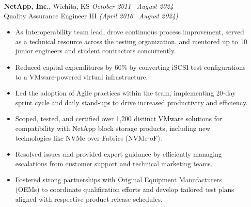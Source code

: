 \documentclass[10pt]{article}       %
\begin{document}
\textbf{NetApp, Inc.}, Wichita, KS \hfill \textit{October 2011 \textendash\ August 2024} \\
\vspace{1pt}
Quality Assurance Engineer III \textit{(April 2016 \textendash\ August 2024)} \\
\begin{itemize}
  \item As Interoperability team lead, drove continuous process improvement, served as a technical resource across the testing organization, and mentored up to 10 junior engineers and student contractors concurrently.
  \item Reduced capital expenditures by 60\% by converting iSCSI test configurations to a VMware-powered virtual infrastructure.
  \item Led the adoption of Agile practices within the team, implementing 20-day sprint cycle and daily stand-ups to drive increased productivity and efficiency.
  \item Scoped, tested, and certified over 1,200 distinct VMware solutions for compatibility with NetApp block storage products, including new technologies like NVMe over Fabrics (NVMe-oF).
  \item Resolved issues and provided expert guidance by efficiently managing escalations from customer support and technical marketing teams.
  \item Fostered strong partnerships with Original Equipment Manufacturers (OEMs) to coordinate qualification efforts and develop tailored test plans aligned with respective product release schedules.
\end{itemize}
\end{document}

